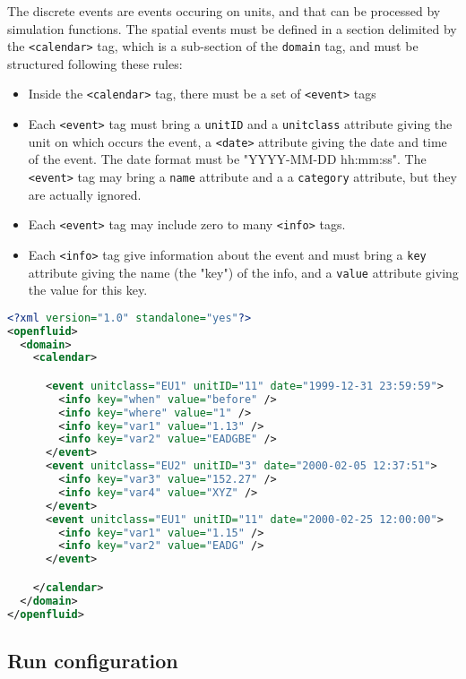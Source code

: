 The discrete events are events occuring on units, and that can be processed by simulation functions. 
\noindent The spatial events must be defined in a section delimited
by the \texttt{<calendar>} tag, which is a sub-section of the \texttt{domain}
tag, and must be structured following these rules:

\begin{itemize}
  \item Inside the \texttt{<calendar>} tag, there must be a set of \texttt{<event>} tags 
  \item Each \texttt{<event>} tag must bring a \texttt{unitID} and a 
  \texttt{unitclass} attribute giving the unit on which occurs the event, a 
  \texttt{<date>} attribute giving the date and time of the event. The date
  format must be "YYYY-MM-DD hh:mm:ss". The \texttt{<event>} tag may bring a
  \texttt{name} attribute and a a \texttt{category} attribute, but they are
  actually ignored.
  \item Each \texttt{<event>} tag may include zero to many \texttt{<info>} tags.
  \item Each \texttt{<info>} tag give information about the event and must
  bring a \texttt{key} attribute giving the name (the "key") of the info, and a
  \texttt{value} attribute giving the value for this key.
\end{itemize}  
  
\begin{lstlisting}[language=xml,title=\footnotesize\textit{example}]
<?xml version="1.0" standalone="yes"?>
<openfluid>
  <domain>
    <calendar>

      <event unitclass="EU1" unitID="11" date="1999-12-31 23:59:59">
        <info key="when" value="before" />
        <info key="where" value="1" />
        <info key="var1" value="1.13" />
        <info key="var2" value="EADGBE" />
      </event>
      <event unitclass="EU2" unitID="3" date="2000-02-05 12:37:51">
        <info key="var3" value="152.27" />
        <info key="var4" value="XYZ" />
      </event>
      <event unitclass="EU1" unitID="11" date="2000-02-25 12:00:00">
        <info key="var1" value="1.15" />
        <info key="var2" value="EADG" />
      </event>

    </calendar>
  </domain>
</openfluid>
\end{lstlisting}
\bigskip

\subsection{Run configuration}


